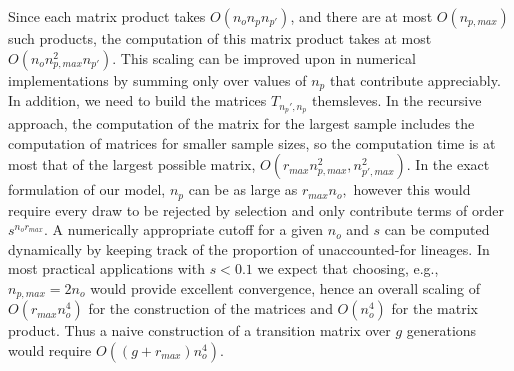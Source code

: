 \documentclass[review]{elsarticle}
\begin{document}
Since each matrix product takes $O(n_o n_p n_{p'})$, and there are at most $O(n_{p,max})$ such products, the computation of this
matrix product takes at most $O(n_o n_{p,max}^2 n_{p'}).$ This scaling can be improved upon in numerical 
implementations by summing only over values of $n_p$ that contribute appreciably. 
In addition, we need to build the matrices $T_{n_p', n_p}$ themsleves. 
In the recursive approach, the computation of the matrix for the largest sample includes the computation of matrices for
smaller sample sizes, so the computation time is at most that of the largest possible matrix, $O(r_{max} n_{p,max}^2, n_{p',max}^2).$ 
In the exact formulation of our model, $n_p$ can be as large as $ r_{max} n_o,$ however this would require every draw to be rejected by selection and
 only contribute terms of order $s^{n_o r_{max}}.$ A numerically appropriate cutoff for a given $n_o$ and $s$ can be computed dynamically 
 by keeping track of the proportion of unaccounted-for lineages. In most practical applications with $s<0.1$ we expect that choosing, e.g.,  
 $n_{p,max}=  2 n_o$ would provide excellent convergence, hence an overall scaling of   $O(r_{max} n_{o}^4)$ for the construction of 
 the matrices and $O(n_o^4)$ for the matrix product.
Thus a naive construction of a transition matrix over $g$ generations would require  $O( (g + r_{max} ) n_o^4).$ 
\end{document}
